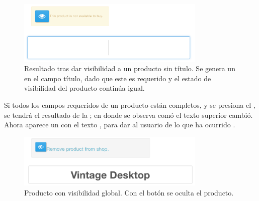 		\begin{figure}[H]
			\centering
			\includegraphics[width=0.8\textwidth]{figuras/productos/details/write/visibility_new_product_autofocus.png}

			\caption{Resultado tras dar visibilidad a un producto sin título. Se genera un \autoFocoINT en el campo título, dado que este es requerido y el estado de visibilidad del producto continúa igual.}
			\label{figure:solution:product:visibility:autofocus}
		\end{figure}

		Si todos los campos requeridos de un producto están completos, y se presiona el \linkINT \youCanMakeItVisibleLABEL, se tendrá el resultado de la ; en donde se observa comó el texto superior cambió. Ahora aparece un \linkINT con el texto \makeInvisibleLABEL, para dar \feedback al usuario de lo que ha ocurrido \cite{online_google_ui_design_material, online_goodgui_org}.

		\begin{figure}[H]
			\centering
			\includegraphics[width=0.8\textwidth]{figuras/productos/details/write/global_visibility.png}

			\caption{Producto con visibilidad global. Con el botón se oculta el producto.}
			\label{figure:solution:product:visibility:global_visibility}
		\end{figure}

